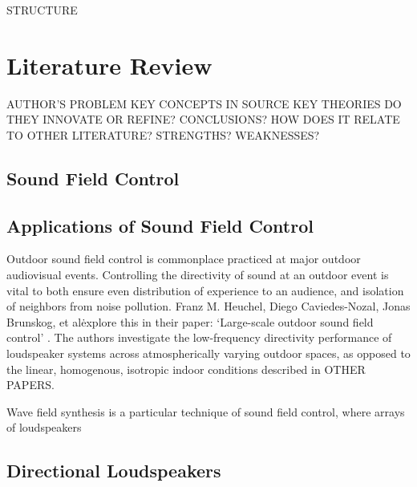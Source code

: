 \documentclass{report}
\begin{document}
    STRUCTURE



\chapter{Literature Review}
    AUTHOR'S PROBLEM
    KEY CONCEPTS IN SOURCE
    KEY THEORIES
    DO THEY INNOVATE OR REFINE?
    CONCLUSIONS?
    HOW DOES IT RELATE TO OTHER LITERATURE?
    STRENGTHS?
    WEAKNESSES?

    \section{Sound Field Control}
        

    \section{Applications of Sound Field Control}

        Outdoor sound field control is commonplace practiced at major outdoor audiovisual events.
        Controlling the directivity of sound at an outdoor event is vital to both ensure even distribution of experience to an audience, and isolation of neighbors from noise pollution.
        Franz M. Heuchel, Diego Caviedes-Nozal, Jonas Brunskog, et al\. explore this in their paper: `Large-scale outdoor sound field control' \cite{heuchel2020large}.
        The authors investigate the low-frequency directivity performance of loudspeaker systems across atmospherically varying outdoor spaces, as opposed to the linear, homogenous, isotropic indoor conditions described in OTHER PAPERS.



        Wave field synthesis is a particular technique of sound field control, where arrays of loudspeakers 



    \section{Directional Loudspeakers}
\end{document}
